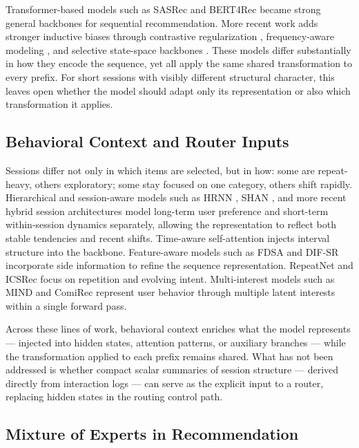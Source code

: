 \documentclass[sigconf,review,anonymous]{acmart}
\newcommand{\jm}[1]{{\color{red} #1}}
\begin{document}
Transformer-based models such as SASRec \cite{kang2018sasrec} and BERT4Rec \cite{sun2019bert4rec} became strong general backbones for sequential recommendation. More recent work adds stronger inductive biases through contrastive regularization \cite{qiu2022duorec,hou2022core}, frequency-aware modeling \cite{du2023fearec,shin2024bsarec}, and selective state-space backbones \cite{liu2025sigma}. These models differ substantially in how they encode the sequence, yet all apply the same shared transformation to every prefix. For short sessions with visibly different structural character, this leaves open whether the model should adapt only its representation or also which transformation it applies.

\subsection{Behavioral Context and Router Inputs}
\jm{Sessions differ not only in which items are selected, but in how: some are repeat-heavy, others exploratory; some stay focused on one category, others shift rapidly.} Hierarchical and session-aware models such as HRNN \cite{quadrana2017hrnn}, SHAN \cite{ying2018shan}, and more recent hybrid session architectures \cite{bauer2024hybridsession} \jm{model long-term user preference and short-term within-session dynamics separately, allowing the representation to reflect both stable tendencies and recent shifts.} Time-aware self-attention \cite{li2020tisasrec} injects interval structure into the backbone. Feature-aware models such as FDSA \cite{zhang2019fdsa} and DIF-SR \cite{xie2022difsr} incorporate side information to refine the sequence representation. RepeatNet \cite{ren2019repeatnet} and ICSRec \cite{qin2024icsrec} focus on repetition and evolving intent. Multi-interest models such as MIND \cite{li2019mind} and ComiRec \cite{cen2020comirec} represent user behavior through multiple latent interests within a single forward pass.

Across these lines of work, behavioral context enriches what the model represents --- injected into hidden states, attention patterns, or auxiliary branches --- while the transformation applied to each prefix remains shared. What has not been addressed is whether compact scalar summaries of session structure — derived directly from interaction logs — can serve as the explicit input to a router, replacing hidden states in the routing control path.

\subsection{Mixture of Experts in Recommendation}
\end{document}
